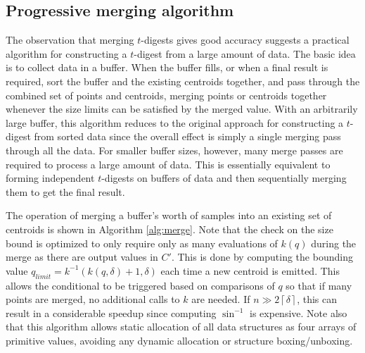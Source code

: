 \documentclass[11pt]{amsart}
\begin{document}
\subsection{Progressive merging algorithm}
The observation that merging $t$-digests gives good accuracy suggests a practical algorithm for constructing a $t$-digest from a large amount of data. The basic idea is to collect data in a buffer. When the buffer fills, or when a final result is required, sort the buffer and the existing centroids together, and pass through the combined set of points and centroids, merging points or centroids together whenever the size limits can be satisfied by the merged value. With an arbitrarily large buffer, this algorithm reduces to the original approach for constructing a $t$-digest from sorted data since the overall effect is simply a single merging pass through all the data. For smaller buffer sizes, however, many merge passes are required to process a large amount of data. This is essentially equivalent to forming independent $t$-digests on buffers of data and then sequentially merging them to get the final result.

The operation of merging a buffer's worth of samples into an existing set of centroids is shown in Algorithm \ref{alg:merge}. Note that the check on the size bound is optimized to only require only as many evaluations of $k(q)$ during the merge as there are output values in $C'$. This is done by computing the bounding value $q_{limit} = k^{-1}(k(q, \delta) + 1, \delta)$ each time a new centroid is emitted. This allows the conditional to be triggered based on comparisons of $q$ so that if many points are merged, no additional calls to $k$ are needed. If $n \gg 2 \left \lceil \delta \right \rceil$, this can result in a considerable speedup since computing $\sin^{-1}$ is expensive. Note also that this algorithm allows static allocation of all data structures as four arrays of primitive values, avoiding any dynamic allocation or structure boxing/unboxing.
\end{document}
